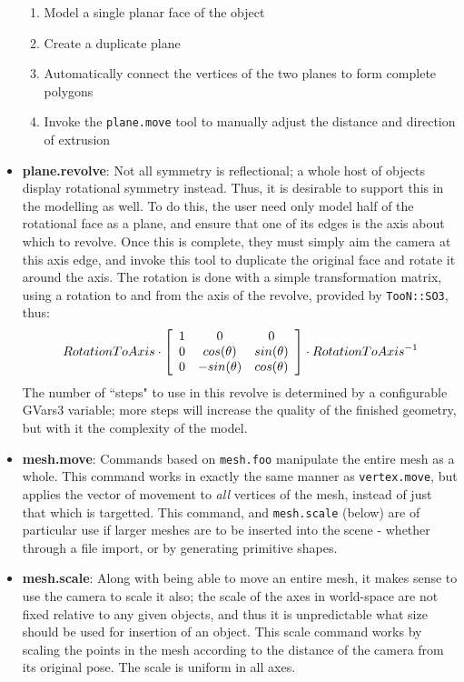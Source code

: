 \documentclass[a4paper,10pt]{article}
\begin{document}
\begin{itemize}
{\begin{enumerate}
 \item{Model a single planar face of the object}
 \item{Create a duplicate plane}
 \item{Automatically connect the vertices of the two planes to form complete polygons}
 \item{Invoke the \texttt{plane.move} tool to manually adjust the distance and direction of extrusion}
\end{enumerate}
}
\item{\textbf{plane.revolve}: Not all symmetry is reflectional; a whole host of objects display rotational symmetry instead. Thus, it is desirable to support this in the modelling as well. To do this, the user need only model half of the rotational face as a plane, and ensure that one of its edges is the axis about which to revolve. Once this is complete, they must simply aim the camera at this axis edge, and invoke this tool to duplicate the original face and rotate it around the axis. The rotation is done with a simple transformation matrix, using a rotation to and from the axis of the revolve, provided by \texttt{TooN::SO3}, thus:
\begin{eqnarray*}
 RotationToAxis \cdot  \left[ 
  \begin{array}{c c c}
    1 & 0 & 0 \\ 
    0 & cos( \theta ) & sin( \theta ) \\ 
    0 & -sin( \theta ) & cos( \theta ) 
  \end{array}\right] \cdot RotationToAxis^{-1}
\end{eqnarray*}
The number of ``steps" to use in this revolve is determined by a configurable GVars3 variable; more steps will increase the quality of the finished geometry, but with it the complexity of the model.}
\item{\textbf{mesh.move}: Commands based on \texttt{mesh.foo} manipulate the entire mesh as a whole. This command works in exactly the same manner as \texttt{vertex.move}, but applies the vector of movement to \textit{all} vertices of the mesh, instead of just that which is targetted. This command, and \texttt{mesh.scale} (below) are of particular use if larger meshes are to be inserted into the scene - whether through a file import, or by generating primitive shapes.}
\item{\textbf{mesh.scale}: Along with being able to move an entire mesh, it makes sense to use the camera to scale it also; the scale of the axes in world-space are not fixed relative to any given objects, and thus it is unpredictable what size should be used for insertion of an object. This scale command works by scaling the points in the mesh according to the distance of the camera from its original pose. The scale is uniform in all axes.}

\end{itemize}
\end{document}

